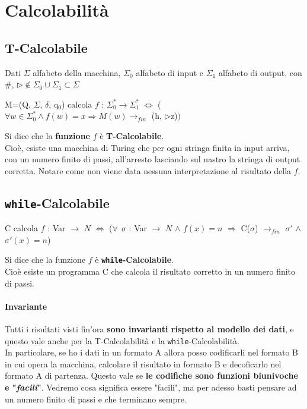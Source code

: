 \documentclass[10pt]{book}
\begin{document}
\section{Calcolabilità}
\subsection{T-Calcolabile}
Dati $\Sigma$ alfabeto della macchina, $\Sigma_0$ alfabeto di input e $\Sigma_1$ alfabeto di output, con \#, $\triangleright \not\in \Sigma_0 \cup \Sigma_1 \subset \Sigma$
\begin{center}
M=(Q, $\Sigma$, $\delta$, q$_0$) calcola $f$ : $\Sigma_0^* \longrightarrow \Sigma_1^*$ $\Leftrightarrow$ ($\forall w \in \Sigma_0^* \wedge f(w) = x \Rightarrow M(w) \rightarrow_{fin}$ (h, $\triangleright$z)$)$
\end{center}
Si dice che la \textbf{funzione} $f$ è \textbf{T-Calcolabile}.\\
Cioè, esiste una macchina di Turing che per ogni stringa finita in input arriva, con un numero finito di passi, all'arresto lasciando sul nastro la stringa di output corretta. Notare come non viene data nessuna interpretazione al risultato della $f$.
\subsection{\texttt{while}-Calcolabile}
\begin{center}
C calcola $f$ : Var $\rightarrow$ $N$ $\Leftrightarrow$ ($\forall\:\: \sigma$ : Var $\rightarrow$ $N$ $\wedge$ $f(x) = n$ $\Rightarrow$ C($\sigma$) $\rightarrow_{fin}$ $\sigma'$ $\wedge$ $\sigma'(x) = n$)
\end{center}
Si dice che la funzione $f$ è \textbf{\texttt{while}-Calcolabile}.\\
Cioè esiste un programma C che calcola il risultato corretto in un numero finito di passi.
\paragraph{Invariante} Tutti i risultati visti fin'ora \textbf{sono invarianti rispetto al modello dei dati}, e questo vale anche per la T-Calcolabilità e la \texttt{while}-Calcolabilità.\\
In particolare, se ho i dati in un formato A allora posso codificarli nel formato B in cui opera la macchina, calcolare il risultato in formato B e decoficarlo nel formato A di partenza. Questo vale se \textbf{le codifiche sono funzioni biunivoche e "\textit{facili}"}. Vedremo cosa significa essere "facili", ma per adesso basti pensare ad un numero finito di passi e che terminano sempre.
\end{document}
